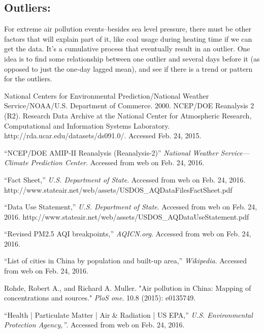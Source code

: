 \documentclass[11pt]{article} %
\begin{document}
\subsection{Outliers:} 

For extreme air pollution events--besides sea level pressure, there must be other factors that will explain part of it, like coal usage during heating time if we can get the data. It’s a cumulative process that eventually result in an outlier. One idea is to find some relationship between one outlier and several days before it (as opposed to just the one-day lagged mean), and see if there is a trend or pattern for the outliers. 







\begin{thebibliography}{1}
\footnotesize

 National Centers for Environmental Prediction/National Weather Service/NOAA/U.S. Department of Commerce. 2000. NCEP/DOE Reanalysis 2 (R2). Research Data Archive at the National Center for Atmospheric Research, Computational and Information Systems Laboratory. http://rda.ucar.edu/datasets/ds091.0/. Accessed Feb. 24, 2015.

 ``NCEP/DOE AMIP-II Reanalysis (Reanalysis-2)'' \textit{National Weather Service---Climate Prediction Center}. Accessed from web on Feb. 24, 2016.

 ``Fact Sheet,'' \textit{U.S.  Department of State}. Accessed from web on Feb. 24, 2016.
http://www.stateair.net/web/assets/USDOS\_AQDataFilesFactSheet.pdf

 ``Data Use Statement,'' \textit{U.S.  Department of State}. Accessed from web on Feb. 24, 2016.
http://www.stateair.net/web/assets/USDOS\_AQDataUseStatement.pdf

 ``Revised PM2.5 AQI breakpoints,'' \textit{AQICN.org}. Accessed from web on Feb. 24, 2016.

 	``List of cities in China by population and built-up area,'' \textit{Wikipedia}. Accessed from web on Feb. 24, 2016.

 Rohde, Robert A., and Richard A. Muller. "Air pollution in China: Mapping of concentrations and sources." \textit{PloS one}. 10.8 (2015): e0135749.

 ``Health | Particulate Matter | Air \& Radiation | US EPA,'' \textit{U.S. Environmental Protection Agency,''}. Accessed from web on Feb. 24, 2016.


\end{thebibliography}
\end{document}
